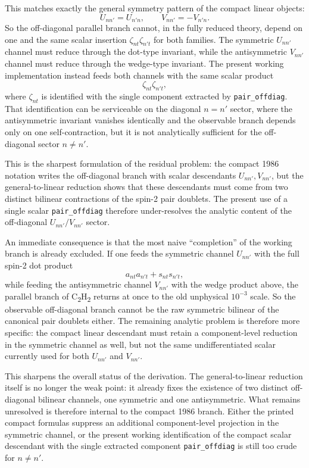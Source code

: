 \documentclass[11pt]{article}
\begin{document}
This matches exactly the general symmetry pattern of the compact linear
objects:
\[
U_{nn'}=U_{n'n},
\qquad
V_{nn'}=-V_{n'n}.
\]
So the off-diagonal parallel branch cannot, in the fully reduced theory, depend
on one and the same scalar insertion $\zeta_{nt}\zeta_{n't}$ for both families.
The symmetric $U_{nn'}$ channel must reduce through the dot-type invariant,
while the antisymmetric $V_{nn'}$ channel must reduce through the wedge-type
invariant. The present working implementation instead feeds both channels with
the same scalar product
\[
\zeta_{nt}\zeta_{n't},
\]
where $\zeta_{nt}$ is identified with the single component extracted by
\texttt{pair\_offdiag}. That identification can be serviceable on the diagonal
$n=n'$ sector, where the antisymmetric invariant vanishes identically and the
observable branch depends only on one self-contraction, but it is not
analytically sufficient for the off-diagonal sector $n\neq n'$.

This is the sharpest formulation of the residual problem: the compact 1986
notation writes the off-diagonal branch with scalar descendants
$U_{nn'},V_{nn'}$, but the general-to-linear reduction shows that these
descendants must come from two distinct bilinear contractions of the spin-2
pair doublets. The present use of a single scalar \texttt{pair\_offdiag}
therefore under-resolves the analytic content of the off-diagonal
$U_{nn'}/V_{nn'}$ sector.

An immediate consequence is that the most naive ``completion'' of the working
branch is already excluded. If one feeds the symmetric channel $U_{nn'}$ with
the full spin-2 dot product
\[
a_{nt}a_{n't}+s_{nt}s_{n't},
\]
while feeding the antisymmetric channel $V_{nn'}$ with the wedge product above,
the parallel branch of \texorpdfstring{C\textsubscript{2}H\textsubscript{2}}{C2H2}
returns at once to the old unphysical $10^{-3}$ scale. So the observable
off-diagonal branch cannot be the raw symmetric bilinear of the canonical pair
doublets either. The remaining analytic problem is therefore more specific:
the compact linear descendant must retain a component-level reduction in the
symmetric channel as well, but not the same undifferentiated scalar currently
used for both $U_{nn'}$ and $V_{nn'}$.

This sharpens the overall status of the derivation. The general-to-linear
reduction itself is no longer the weak point: it already fixes the existence of
two distinct off-diagonal bilinear channels, one symmetric and one
antisymmetric. What remains unresolved is therefore internal to the compact
1986 branch. Either the printed compact formulas suppress an additional
component-level projection in the symmetric channel, or the present working
identification of the compact scalar descendant with the single extracted
component \texttt{pair\_offdiag} is still too crude for $n\neq n'$.
\end{document}
